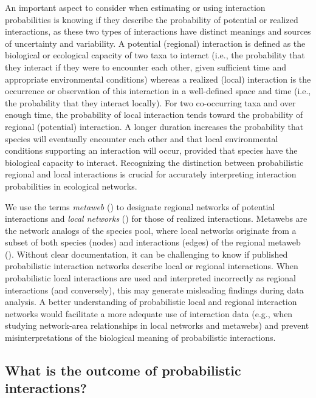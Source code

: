 An important aspect to consider when estimating or using interaction
probabilities is knowing if they describe the probability of potential or
realized interactions, as these two types of interactions have distinct meanings
and sources of uncertainty and variability. A potential (regional) interaction
is defined as the biological or ecological capacity of two taxa to interact
(i.e., the probability that they interact if they were to encounter each other,
given sufficient time and appropriate environmental conditions) whereas a
realized (local) interaction is the occurrence or observation of this
interaction in a well-defined space and time (i.e., the probability that they
interact locally). For two co-occurring taxa and over enough time, the
probability of local interaction tends toward the probability of regional
(potential) interaction. A longer duration increases the probability that
species will eventually encounter each other and that local environmental
conditions supporting an interaction will occur, provided that species have the
biological capacity to interact. Recognizing the distinction between
probabilistic regional and local interactions is crucial for accurately
interpreting interaction probabilities in ecological networks.

We use the terms \textit{metaweb} (\cite{Dunne2006Network}) to designate
regional networks of potential interactions and \textit{local networks}
(\cite{Poisot2012Dissimilarity}) for those of realized interactions. Metawebs
are the network analogs of the species pool, where local networks originate from
a subset of both species (nodes) and interactions (edges) of the regional
metaweb (\cite{Saravia2022Ecological}). Without clear documentation, it can be
challenging to know if published probabilistic interaction networks describe
local or regional interactions. When probabilistic local interactions are used
and interpreted incorrectly as regional interactions (and conversely), this may
generate misleading findings during data analysis. A better understanding of
probabilistic local and regional interaction networks would facilitate a more
adequate use of interaction data (e.g., when studying network-area relationships
in local networks and metawebs) and prevent misinterpretations of the biological
meaning of probabilistic interactions. 

\subsection{What is the outcome of probabilistic interactions?}

